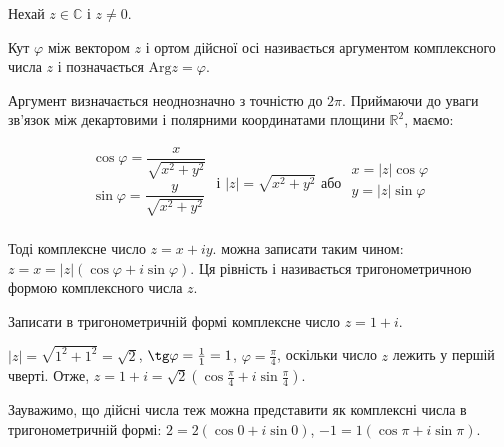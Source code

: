 Нехай $z \in \mathbb{C}$ і $z \neq 0$.

\begin{definition}
	Кут $\varphi$ між вектором $z$ і ортом дійсної осі називається аргументом
	комплексного числа $z$ і позначається $\text{Arg}z = \varphi$.
\end{definition}

\parbox{3cm}{}
\parbox{9cm}{
Аргумент визначається неоднозначно з точністю до $2\pi$.
Приймаючи до уваги зв'язок між декартовими і
полярними координатами площини $\mathbb{R}^2$, маємо:

$$\begin{array}{l}
    \cos \varphi = \dfrac{x}{\sqrt{x^2 + y^2}} \\
    \sin \varphi = \dfrac{y}{\sqrt{x^2 + y^2}} \\
\end{array}\text{ і }|z| = \sqrt{x^2 + y^2}\text{ або }\begin{array}{l}
    x = |z|\cos\varphi \\
    y = |z|\sin\varphi \\
\end{array}$$
}


Тоді комплексне число $z =x +iy$. можна записати таким чином:
$z = x = |z|(\cos\varphi + i\sin\varphi)$. Ця рівність і називається тригонометричною формою
комплексного числа $z$. 

\begin{problem}
    Записати в тригонометричній формі комплексне число $z = 1 + i$.
\end{problem}
\begin{solution}
    $|z| = \sqrt{1^2 + 1^2} = \sqrt{2}$, $\tg\varphi = \frac{1}{1} = 1$, $\varphi = \frac{\pi}{4}$, оскільки число $z$
    лежить у першій чверті. Отже, $z = 1 + i = \sqrt{2}(\cos\frac{\pi}{4} + i\sin\frac{\pi}{4})$.
\end{solution}

Зауважимо, що дійсні числа теж можна представити як комплексні числа в
тригонометричній формі: $2 = 2(\cos 0 + i\sin 0)$, $-1 = 1(\cos \pi + i\sin \pi)$. 

